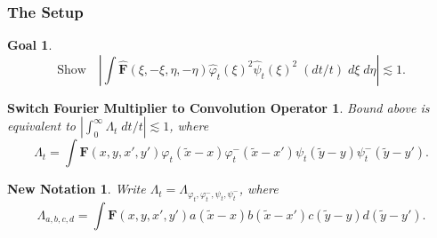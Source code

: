 \documentclass[usenames,dvipsnames,12pt]{beamer}
\newtheorem*{goal}{Goal}
\newtheorem*{singular}{Switch Fourier Multiplier to Convolution Operator}
\newtheorem*{notation}{New Notation}
\begin{document}
\begin{frame}
    \frametitle{The Setup}


    \begin{goal}
        \small

        \vspace{-1em}
        \[ \text{Show}\quad \left| \int \widehat{\mathbf{F}}(\xi,-\xi,\eta,-\eta) \widehat{\varphi}_t(\xi)^2 \widehat{\psi}_t(\xi)^2\; (dt/t)\; d\xi\; d\eta \right| \lesssim 1. \]
    \end{goal}



    \pause

    \begin{singular}
        \small

        Bound above is equivalent to $|\int_0^\infty \Lambda_t\; dt/t| \lesssim 1$, where
        \vspace{-0.5em}
        \[ \Lambda_t = \int \mathbf{F}(x,y,x',y') \varphi_t(\tilde{x} - x) \varphi_t^-(\tilde{x} - x') \psi_t(\tilde{y} - y) \psi_t^-(\tilde{y} - y'). \]
    \end{singular}

    \pause

    \begin{notation}
        \small
        Write $\Lambda_t = \Lambda_{\varphi_t, \varphi_t^-, \psi_t, \psi_t^-}$, where
        \vspace{-0.5em}
        \[ \Lambda_{a,b,c,d} = \int \mathbf{F}(x,y,x',y') a(\tilde{x} - x) b(\tilde{x} - x') c(\tilde{y} - y) d(\tilde{y} - y'). \]
    \end{notation}
    
\end{frame}
\end{document}
